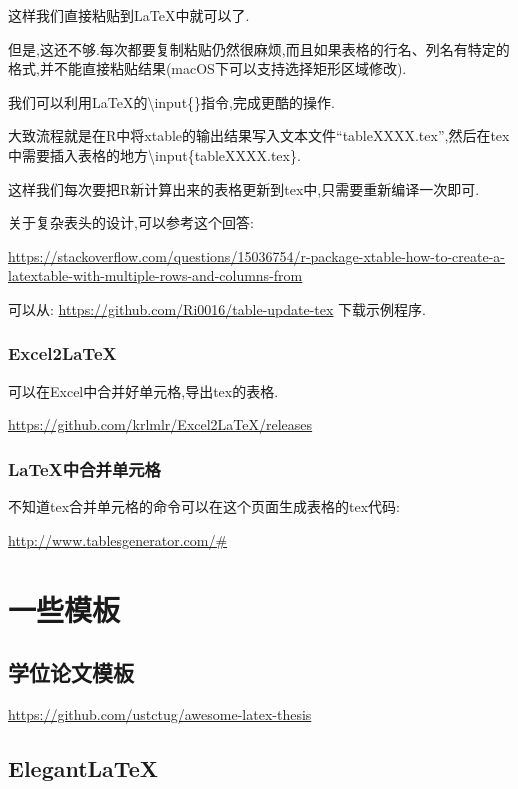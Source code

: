 \documentclass[]{ctexbook}
\begin{document}
这样我们直接粘贴到LaTeX中就可以了.

但是,这还不够.每次都要复制粘贴仍然很麻烦,而且如果表格的行名、列名有特定的格式,并不能直接粘贴结果(macOS下可以支持选择矩形区域修改).

我们可以利用LaTeX的\textbackslash{}input\{\}指令,完成更酷的操作.

大致流程就是在R中将xtable的输出结果写入文本文件``tableXXXX.tex'',然后在tex中需要插入表格的地方\textbackslash{}input\{tableXXXX.tex\}.

这样我们每次要把R新计算出来的表格更新到tex中,只需要重新编译一次即可.

关于复杂表头的设计,可以参考这个回答:

\url{https://stackoverflow.com/questions/15036754/r-package-xtable-how-to-create-a-latextable-with-multiple-rows-and-columns-from}

可以从:
\url{https://github.com/Ri0016/table-update-tex}
下载示例程序.

\hypertarget{excel2latex}{%
\subsection{Excel2LaTeX}\label{excel2latex}}

可以在Excel中合并好单元格,导出tex的表格.

\url{https://github.com/krlmlr/Excel2LaTeX/releases}

\hypertarget{latex}{%
\subsection{LaTeX中合并单元格}\label{latex}}

不知道tex合并单元格的命令可以在这个页面生成表格的tex代码:

\url{http://www.tablesgenerator.com/\#}

\hypertarget{template}{%
\chapter{一些模板}\label{template}}

\hypertarget{section-24}{%
\section{学位论文模板}\label{section-24}}

\url{https://github.com/ustctug/awesome-latex-thesis}

\hypertarget{elegantlatex}{%
\section{ElegantLaTeX}\label{elegantlatex}}
\end{document}
